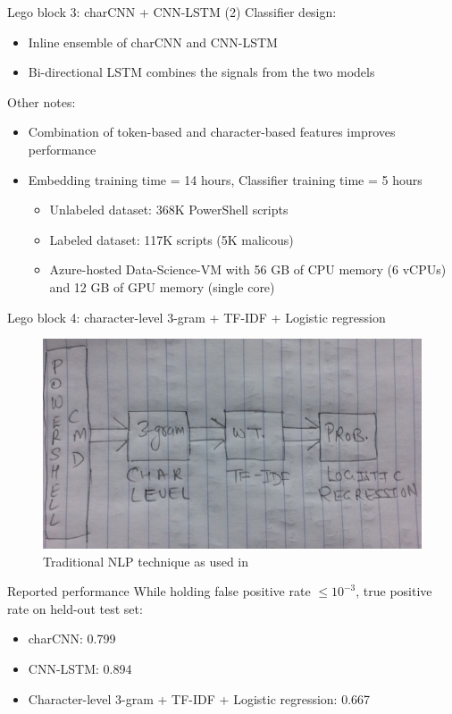 \documentclass[10pt]{beamer}
\begin{document}
\begin{frame}{Lego block 3: charCNN + CNN-LSTM (2)}
	Classifier design:
	\begin{itemize}
		\item Inline ensemble of charCNN and CNN-LSTM
		\item Bi-directional LSTM combines the signals from the two models
	\end{itemize}
	Other notes:
	\begin{itemize}
		\item Combination of token-based and character-based features improves performance
		\item Embedding training time = 14 hours, Classifier training time = 5 hours
		\begin{itemize}
			\item Unlabeled dataset: 368K PowerShell scripts
			\item Labeled dataset: 117K scripts (5K malicous)
			\item Azure-hosted Data-Science-VM with 56 GB of CPU memory (6 vCPUs) and 12 GB of GPU memory (single core)
		\end{itemize}
	\end{itemize}
\end{frame}

\begin{frame}{Lego block 4: character-level 3-gram + TF-IDF + Logistic regression}
	\begin{figure}
		\includegraphics[scale=0.50]{3gram-tfidf-logistic}
		\caption{Traditional NLP technique as used in \cite{amsi2019}}
	\end{figure}
\end{frame}

\begin{frame}{Reported performance}
        While holding false positive rate $\le 10^{-3}$, true positive rate on held-out test set:
        \begin{itemize}
		\item charCNN: 0.799
		\item CNN-LSTM: 0.894
		\item Character-level 3-gram + TF-IDF + Logistic regression: 0.667
        \end{itemize}
\end{frame}
\end{document}
